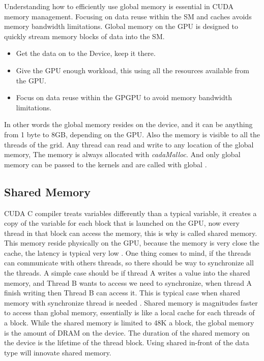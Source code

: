 Understanding how to efficiently use global memory is essential in CUDA memory management. Focusing on data reuse within the SM and caches avoids memory bandwidth limitations. Global memory on the GPU is designed to quickly stream memory blocks of data into the SM.

\begin{itemize}
\item Get the data on to the Device, keep it there.
\item Give the GPU enough workload, this using all the resources available from the GPU.
\item Focus on data reuse within the GPGPU to avoid memory bandwidth limitations.
\end{itemize}

In other words the global memory resides on the device, and it can be anything from 1 byte to 8GB, depending on the GPU. Also the memory is visible to all the threads of the grid. Any thread can read and write to any location of the global memory, The memory is always allocated with \textit{cadaMalloc}. And only global memory can be passed to the kernels and are called with \twoline global \twoline. \cite{design}



\subsection{Shared Memory}

CUDA C compiler treats variables differently than a typical variable, it creates a copy of the variable for each block that is launched on the GPU, now every thread in that block can access the memory, this is why is called shared memory. This memory reside physically on the GPU, because the memory is very close the cache, the latency is typical very low \cite{example}. One thing comes to mind, if the threads can communicate with others threads, so there should be way to synchronize all the threads. A simple case should be if thread A writes a value into the shared memory, and Thread B wants to access we need to synchronize, when thread A finish writing then Thread B can access it. This is typical case when shared memory with synchronize thread is needed \cite{cook}.
Shared memory is magnitudes faster to access than global memory, essentially is like a local cache for each threads of a block. While  the shared memory is limited to 48K a block, the global memory is the amount of DRAM on the device. The duration of the shared memory on the device is the lifetime of the thread block. Using \twoline shared \twoline in-front of the data type will innovate shared memory.

